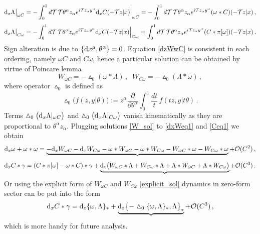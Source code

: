 \documentclass[12pt]{article}
\newcommand{\dr}{{{\rm d}}}
\newcommand{\go}{\omega}
\newcommand{\hmt}{\vartriangle}
\begin{document}
\begin{equation}\label{dx_Lambda_goC}
\dr_x\Lambda\big|_{\go C}= -\int_0^1 d\mathcal{T}\, \mathcal{T} \theta^\alpha z_\alpha e^{i\mathcal{T}z_\alpha y^\alpha}\dr_x C(-\mathcal{T}z|x)\Big|_{\go C}= - \int_0^1 d\mathcal{T}\, \mathcal{T} \theta^\alpha z_\alpha e^{i\mathcal{T}z_\alpha y^\alpha}(\go\ast C)(-\mathcal{T}z|x)\,,
\end{equation}
\begin{equation}\label{dx_Lambda_Cgo}
\dr_x\Lambda\big|_{C \go}= -\int_0^1 d\mathcal{T}\, \mathcal{T} \theta^\alpha z_\alpha e^{i\mathcal{T}z_\alpha y^\alpha}\dr_x C(-\mathcal{T}z|x)\Big|_{C\go}=  \int_0^1 d\mathcal{T}\, \mathcal{T} \theta^\alpha z_\alpha e^{i\mathcal{T}z_\alpha y^\alpha}(C\ast\pi[\go])(-\mathcal{T}z|x)\,.
\end{equation}
Sign alteration is due to $\{\dr x^\mu,\theta^\alpha\}=0$.
Equation \eqref{dzWwC} is consistent in each ordering, namely $\go C$ and $C\go$, hence a particular solution can be obtained by virtue of Poincare lemma
\begin{equation}\label{explicit_sol}
W_{\go C}=-\hmt_0 (\go \ast \Lambda)\,,\;\; W_{C\go}=-\hmt_0 (\Lambda\ast \go)\,,
\end{equation}
where operator $\hmt_0$ is defined as
\begin{equation}\label{W_sol}
\hmt_0\big(f(z,y|\theta)\big):=z^\alpha \frac{\partial}{\partial \theta^\alpha}\int_0^1 \frac{dt}{t}\, f(tz,y|t\theta)\,.
\end{equation}
Terms $\hmt_0 \big(\dr_x\Lambda|_{\go C}\big)$ and $\hmt_0\big(\dr_x \Lambda|_{C\go}\big)$ vanish kinematically as they are proportional to $\theta^\alpha z_\alpha$. Plugging solutions \eqref{W_sol} to \eqref{dxWeq1} and \eqref{Ceq1} we obtain
\begin{equation}\label{COMS_Chiral}
\dr_x \go+\go\ast \go=\underbrace{-\dr_x W_{\go C} -\dr_x W_{C\go}-\go \ast W_{\go C}-\go \ast W_{C\go}-W_{\go C}\ast \go-W_{C\go}\ast \go}+\mathcal{O}(C^2)\, ,
\end{equation}
\begin{equation}\label{Cubic_Chiral}
\dr_x C \ast \gamma=(C\ast \pi[\go]-\go \ast C)\ast \gamma+\underbrace{\dr_z\big(W_{\go C} \ast \Lambda+W_{C\go}\ast \Lambda+\Lambda\ast W_{\go C}+\Lambda\ast W_{C\go}\big)}+\mathcal{O}(C^3)\,.
\end{equation}
Or using the explicit form of $W_{\go C}$ and $W_{C\go}$ \eqref{explicit_sol} dynamics in zero-form sector can be put into the form
\begin{equation}\label{Cubic_Chiral_expl}
\dr_x C\ast \gamma=\dr_z\{\go,\Lambda\}_\ast+\underbrace{\dr_z\big\{-\hmt_0\{\go,\Lambda\}_\ast,\Lambda\big\}_\ast}+\mathcal{O}(C^3)\,,
\end{equation}
which is more handy for future analysis.
\end{document}
